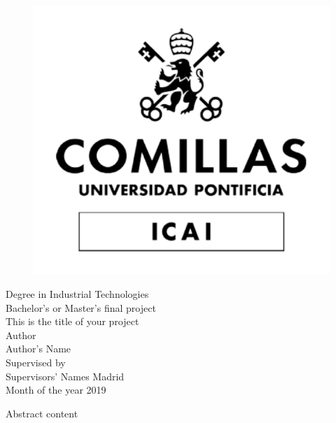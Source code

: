 \documentclass[12pt, a4paper, twoside]{book} %
\newenvironment{abstract}%
{\cleardoublepage \null \vfill \begin{center}%
		\bfseries \abstractname \end{center}}%
{\vfill\null}
\begin{document}
	
	\frontmatter %
	\pagestyle{empty} %
	
	\begin{titlepage}
		\begin{figure}
			\centering
			\includegraphics[width=0.3\linewidth]{LogoUniversidadBN}
		\end{figure}
		\centering
		\Large Degree in Industrial Technologies \\ %
		\vspace*{2.5em} %
		\centering
		Bachelor's or Master's final project \\ %
		\vspace*{1em}
		This is the title of your project %
		\\ \large
		\vspace*{3em}
		Author \\ Author's Name \\ %
		\vspace*{1em}
		Supervised by \\ Supervisors' Names %
		\vfill
		Madrid \\
		Month of the year 2019 %
	\end{titlepage}
	
	\begin{abstract}
		Abstract content
	\end{abstract}

	\cleardoublepage %
\end{document}
